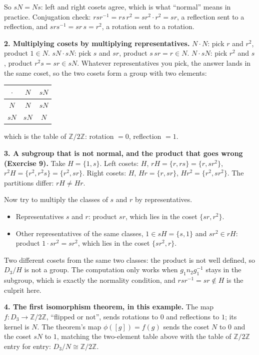 \documentclass[10pt]{article}
\newcommand{\Z}{\mathbb{Z}}
\begin{document}
{\begin{minipage}[t]{744pt}
\begin{minipage}[t]{360pt}
\raggedright
So $sN=Ns$: left and right cosets agree, which is what ``normal'' means in practice. Conjugation check: $rsr^{-1}=rs\,r^2=sr^2\cdot r^2=sr$, a reflection sent to a reflection, and $srs^{-1}=sr\,s=r^2$, a rotation sent to a rotation.
\par\vspace{4pt}
{\sffamily\bfseries 2. Multiplying cosets by multiplying representatives.} $N\cdot N$: pick $r$ and $r^2$, product $1\in N$. $sN\cdot sN$: pick $s$ and $sr$, product $s\,sr=r\in N$. $N\cdot sN$: pick $r^2$ and $s$, product $r^2s=sr\in sN$. Whatever representatives you pick, the answer lands in the same coset, so the two cosets form a group with two elements:
\begin{center}\small
\begin{tabular}{c|cc}
$\cdot$ & $N$ & $sN$\\ \hline
$N$ & $N$ & $sN$\\
$sN$ & $sN$ & $N$
\end{tabular}\qquad which is the table of $\Z/2\Z$: rotation $=0$, reflection $=1$.
\end{center}
\end{minipage}\hfill
\begin{minipage}[t]{360pt}\vspace{0pt}
{\sffamily\bfseries 3. A subgroup that is not normal, and the product that goes wrong (Exercise 9).} Take $H=\{1,s\}$. Left cosets: $H$, $rH=\{r,rs\}=\{r,sr^2\}$, $r^2H=\{r^2,r^2s\}=\{r^2,sr\}$. Right cosets: $H$, $Hr=\{r,sr\}$, $Hr^2=\{r^2,sr^2\}$. The partitions differ: $rH\neq Hr$.
\par\vspace{3pt}
Now try to multiply the classes of $s$ and $r$ by representatives.
\begin{itemize}[nosep,leftmargin=*]
\item Representatives $s$ and $r$: product $sr$, which lies in the coset $\{sr,r^2\}$.
\item Other representatives of the same classes, $1\in sH=\{s,1\}$ and $sr^2\in rH$: product $1\cdot sr^2=sr^2$, which lies in the coset $\{sr^2,r\}$.
\end{itemize}
Two different cosets from the same two classes: the product is not well defined, so $D_3/H$ is not a group. The computation only works when $g_1n_2g_1^{-1}$ stays in the subgroup, which is exactly the normality condition, and $rsr^{-1}=sr\notin H$ is the culprit here.
\par\vspace{4pt}
{\sffamily\bfseries 4. The first isomorphism theorem, in this example.} The map $f:D_3\to\Z/2\Z$, ``flipped or not'', sends rotations to $0$ and reflections to $1$; its kernel is $N$. The theorem's map $\phi([g])=f(g)$ sends the coset $N$ to $0$ and the coset $sN$ to $1$, matching the two-element table above with the table of $\Z/2\Z$ entry for entry: $D_3/N\cong\Z/2\Z$.

\end{minipage}
\end{minipage}}
\end{document}
